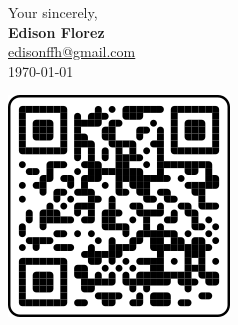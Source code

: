 \vfill
\begin{minipage}[c]{.75\textwidth}
    Your sincerely,\\[5mm]
    \textbf{Edison Florez}\\
    \href{mailto:edisonffh@gmail.com}{edisonffh@gmail.com}\\
    \today
\end{minipage}
\begin{minipage}[c]{.2\textwidth}
    \centering
    \href{
        https://github.com/e-florez/e-florez
    }{
        \includegraphics[scale=0.4]{figs/qrcode_github_page.png}
    }
\end{minipage}
